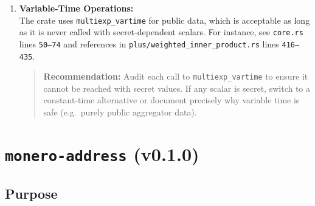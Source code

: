 \documentclass[12pt,a4paper]{article}
\begin{document}
\begin{enumerate}
    \item \textbf{Variable-Time Operations:}\\
    The crate uses \texttt{multiexp\_vartime} for public data, which is acceptable as long as it is never called with secret-dependent scalars. For instance, see \texttt{core.rs} lines \texttt{50--74} and references in \texttt{plus/weighted\_inner\_product.rs} lines \texttt{416--435}.
    \begin{quote}
        \textbf{Recommendation:} Audit each call to \texttt{multiexp\_vartime} to ensure it cannot be reached with secret values. If any scalar is secret, switch to a constant-time alternative or document precisely why variable time is safe (e.g.\ purely public aggregator data).
    \end{quote}

\end{enumerate}



\section{\texttt{monero-address} (v0.1.0)}

\subsection{Purpose}
\end{document}
